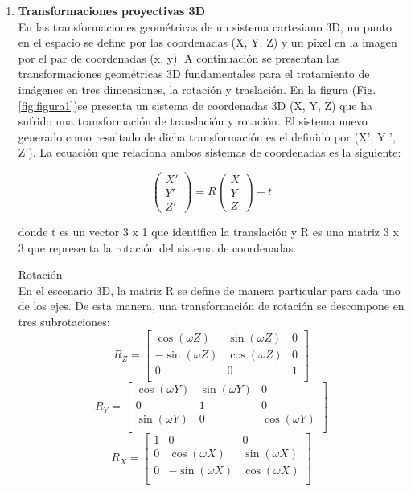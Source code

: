 \documentclass[a4,10pt]{article}
\begin{document}
\begin{enumerate}

\item \textbf{Transformaciones proyectivas 3D}\\
En las transformaciones geométricas de un sistema cartesiano 3D, un punto en el espacio se define por las coordenadas (X, Y, Z) y un pixel en la imagen por el par de coordenadas (x, y).
A continuación se presentan las transformaciones geométricas 3D fundamentales para el tratamiento de imágenes en tres dimensiones, la rotación y traslación. 
En la figura (Fig. \ref{fig:figura1})se presenta un sistema de coordenadas 3D (X, Y, Z) que ha sufrido una transformación de translación y rotación. El sistema nuevo generado como resultado de dicha transformación es el definido por (X’, Y ’, Z’). La ecuación que relaciona ambos sistemas de coordenadas es la siguiente: 

\begin{equation}
\begin{pmatrix}
X'\\
Y'\\
Z'
\end{pmatrix}
= R
\begin{pmatrix}
X\\
Y\\
Z
\end{pmatrix}
+ t
\end{equation}

donde t es un vector 3 x 1 que identifica la translación y R es una matriz 3 x 3 que representa la rotación del sistema de coordenadas.

\underline{Rotación}\\
En el escenario 3D, la matriz R se define de manera particular para cada uno de los ejes. De esta manera, una transformación de rotación se descompone en tres subrotaciones:\\
\begin{equation}
R_Z =
\begin{bmatrix}
\cos(\omega Z) & \sin(\omega Z) & 0\\
-\sin(\omega Z) & \cos(\omega Z) & 0\\
0 & 0 & 1\\
\end{bmatrix}
\end{equation}
\begin{equation}
R_Y =
\begin{bmatrix}
\cos(\omega Y) & \sin(\omega Y) & 0\\
0 & 1 & 0\\
\sin(\omega Y) & 0 & \cos(\omega Y)\\
\end{bmatrix}
\end{equation}
\begin{equation}
R_X =
\begin{bmatrix}
1 & 0 & 0\\
0 & \cos(\omega X) & \sin(\omega X)\\
0 & -\sin(\omega X) & \cos(\omega X)\\


\end{bmatrix}
\end{equation}
\end{enumerate}
\end{document}
